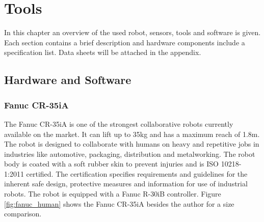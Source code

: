 \chapter{Tools}
\label{chap:tools}
In this chapter an overview of the used robot, sensors, tools and software is given. Each section contains a brief description and hardware components include a specification list. Data sheets will be attached in the appendix.
\section{Hardware and Software}
\label{sec: hwsw}
\subsection{Fanuc CR-35iA}
\label{subsec:fanuc}
The Fanuc CR-35iA \cite{Fanuc} is one of the strongest collaborative robots currently available on the market. It can lift up to 35kg and has a maximum reach of 1.8m. The robot is designed to collaborate with humans on heavy and repetitive jobs in industries like automotive, packaging, distribution and metalworking. The robot body is coated with a soft rubber skin to prevent injuries and is ISO 10218-1:2011 certified. The certification specifies requirements and guidelines for the inherent safe design, protective measures and information for use of industrial robots. The robot is equipped with a Fanuc R-30iB controller. Figure \ref{fig:fanuc_human} shows the Fanuc CR-35iA besides the author for a size comparison.


